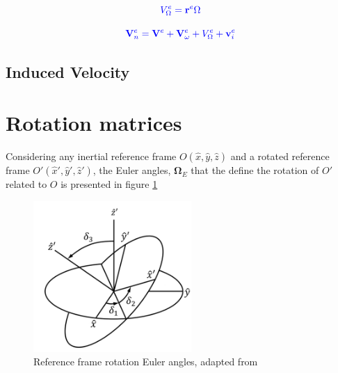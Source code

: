 \begin{equation}
    \textcolor{blue}{V^e_{\Omega} = \mathbf{r}^e \Omega}
    \label{eq:rotor_ang_vel_element}
\end{equation}


\begin{equation}
    \textcolor{blue}{\mathbf{V}_{n}^e = \mathbf{V}^e + \mathbf{V}^e_\omega + V^e_{\Omega} + \mathbf{v}_i^e}
    \label{eq:element_full_velocity}
\end{equation}

\subsection{Induced Velocity}
\label{sec:induced_Velocity}


\section{Rotation matrices}
\label{sec:rotation_matrices}

Considering any inertial reference frame $O(\hat{x},\hat{y},\hat{z})$ and a rotated reference frame $O'(\hat{x}',\hat{y}',\hat{z}')$, the Euler angles, $\boldsymbol{\Omega}_E$ that the define the rotation of $O'$ related to $O$ is presented in figure \ref{fig:rotation_frames_img}

\begin{figure}[!htb]
    \centering
    \includegraphics[width=6cm]{Figures/background/rotation_matrices/rotation_frames.png}
    \caption{Reference frame rotation Euler angles, adapted from \cite{schwab_how_2006}}
    \label{fig:rotation_frames_img}
\end{figure}

